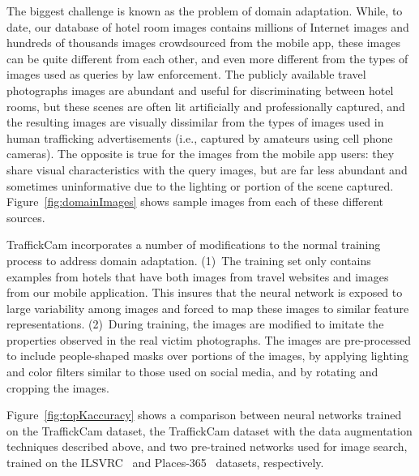 \documentclass[12pt]{article}
\begin{document}
The biggest challenge is known as the problem of domain adaptation. While, to date, our database of hotel room images contains millions of Internet images and hundreds of thousands images crowdsourced from the mobile app, these images can be quite different from each other, and even more different from the types of images used as queries by law enforcement. The publicly available travel photographs images are abundant and useful for discriminating between hotel rooms, but these scenes are often lit artificially and professionally captured, and the resulting images are visually dissimilar from the types of images used in human trafficking advertisements (i.e., captured by amateurs using cell phone cameras). The opposite is true for the images from the mobile app users: they share visual characteristics with the query images, but are far less abundant and sometimes uninformative due to the lighting or portion of the scene captured. Figure~\ref{fig:domainImages} shows sample images from each of these different sources.

TraffickCam incorporates a number of modifications to the normal training process to address domain adaptation. (1)~The training set only contains examples from hotels that have both images from travel websites and images from our mobile application. This insures that the neural network is exposed to large variability among images and forced to map these images to similar feature representations. (2)~During training, the images are modified to imitate the properties observed in the real victim photographs. The images are pre-processed to include people-shaped masks over portions of the images, by applying lighting and color filters similar to those used on social media, and by rotating and cropping the images.

Figure~\ref{fig:topKaccuracy} shows a comparison between neural networks trained on the TraffickCam dataset, the TraffickCam dataset with the data augmentation techniques described above, and two pre-trained networks used for image search, trained on the ILSVRC~\cite{ILSVRC15} and Places-365~\cite{zhou2017places} datasets, respectively.
\end{document}
